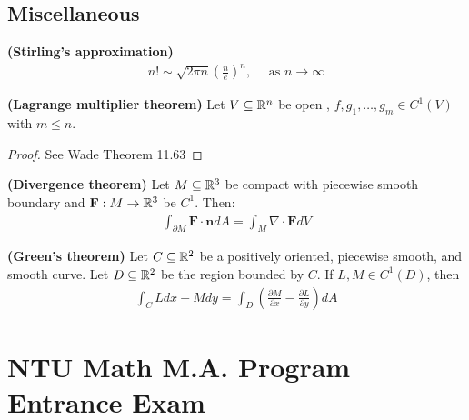 \documentclass{report}
\begin{document}
\section{Miscellaneous}
\begin{theorem}
\label{THSa}
\textbf{(Stirling's approximation)} 
\begin{align*}
n!\sim \sqrt{2\pi n} \left(\frac{n}{e} \right)^n  ,\quad \text{ as }n\rightarrow \infty
\end{align*}
\end{theorem}
\begin{theorem}
\textbf{(Lagrange multiplier theorem)} Let $V \subseteq \mathbb{R}^n$ be open , $f,g_1,\dots ,g_m \in C^1(V)$ with $m\leq n$. 
\end{theorem}
\begin{proof}
See Wade Theorem 11.63
\end{proof}
\begin{theorem}
\label{THdivt}
\textbf{(Divergence theorem)}  Let $M \subseteq \mathbb{R}^3$ be compact with piecewise smooth boundary and $\textbf{F}:M\rightarrow \mathbb{R}^3$ be $C^1$. Then:  
\begin{align*}
\int_{\partial M} \textbf{F} \cdot \textbf{n} dA = \int_{M} \nabla \cdot \textbf{F} dV 
\end{align*}
\end{theorem}
\begin{theorem}
\label{THGt}
\textbf{(Green's theorem)} Let $C\subseteq \mathbb{R}^2$ be a positively oriented, piecewise smooth, and smooth curve. Let $D\subseteq \mathbb{R}^2$ be the region bounded by $C$. If  $L,M \in C^1(D)$, then 
\begin{align*}
\int_C Ldx+M dy= \int_D  \left( \frac{\partial M}{\partial x} - \frac{\partial L}{\partial y} \right) dA 
\end{align*}
\end{theorem}
\chapter{NTU Math M.A. Program Entrance Exam}
\end{document}
